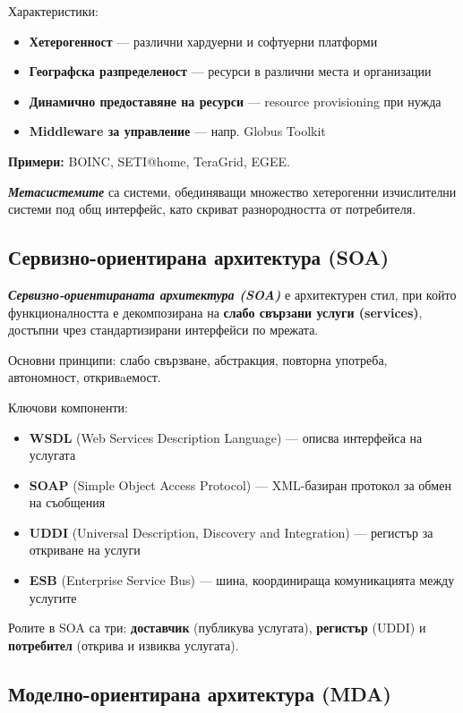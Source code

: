 \documentclass{scrartcl}
\begin{document}
\begin{FlushLeft}
Характеристики:
\begin{itemize}
    \item \textbf{Хетерогенност} — различни хардуерни и софтуерни платформи
    \item \textbf{Географска разпределеност} — ресурси в различни места и организации
    \item \textbf{Динамично предоставяне на ресурси} — resource provisioning при нужда
    \item \textbf{Middleware за управление} — напр. Globus Toolkit
\end{itemize}
\textbf{Примери:} BOINC, SETI@home, TeraGrid, EGEE.

\textbf{\textit{Метасистемите}} са системи, обединяващи множество хетерогенни изчислителни системи под общ интерфейс,
като скриват разнородността от потребителя.

\subsection{Сервизно-ориентирана архитектура (SOA)}

\textbf{\textit{Сервизно-ориентираната архитектура (SOA)}} е архитектурен стил, при който функционалността
е декомпозирана на \textbf{слабо свързани услуги (services)}, достъпни чрез стандартизирани интерфейси по мрежата.

Основни принципи: слабо свързване, абстракция, повторна употреба, автономност, откривaемост.

Ключови компоненти:
\begin{itemize}
    \item \textbf{WSDL} (Web Services Description Language) — описва интерфейса на услугата
    \item \textbf{SOAP} (Simple Object Access Protocol) — XML-базиран протокол за обмен на съобщения
    \item \textbf{UDDI} (Universal Description, Discovery and Integration) — регистър за откриване на услуги
    \item \textbf{ESB} (Enterprise Service Bus) — шина, координираща комуникацията между услугите
\end{itemize}

Ролите в SOA са три: \textbf{доставчик} (публикува услугата), \textbf{регистър} (UDDI) и \textbf{потребител} (открива и извиква услугата).

\subsection{Моделно-ориентирана архитектура (MDA)}


\end{FlushLeft}
\end{document}
